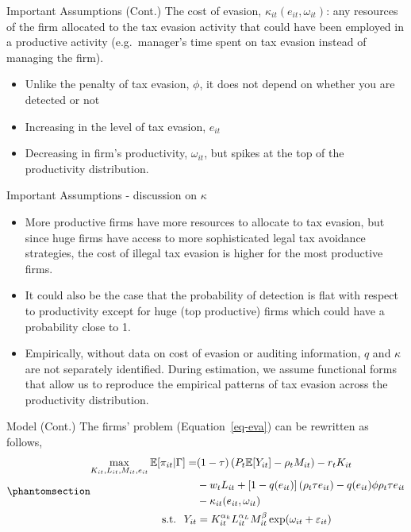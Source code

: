 \documentclass[
  ignorenonframetext,
  aspectratio=169,
]{beamer}
\providecommand{\tightlist}{%
  \setlength{\itemsep}{0pt}\setlength{\parskip}{0pt}}
\begin{document}
\begin{frame}{Important Assumptions (Cont.)}
\protect{}\label{important-assumptions-cont.}
The cost of evasion, \(\kappa_{it}(e_{it}, \omega_{it})\): any resources
of the firm allocated to the tax evasion activity that could have been
employed in a productive activity (e.g.~manager's time spent on tax
evasion instead of managing the firm).

\begin{itemize}
\tightlist
\item
  Unlike the penalty of tax evasion, \(\phi\), it does not depend on
  whether you are detected or not
\item
  Increasing in the level of tax evasion, \(e_{it}\)
\item
  Decreasing in firm's productivity, \(\omega_{it}\), but spikes at the
  top of the productivity distribution.
\end{itemize}
\end{frame}

\begin{frame}{Important Assumptions - discussion on \(\kappa\)}
\protect{}\label{important-assumptions---discussion-on-kappa}
\begin{itemize}
\tightlist
\item
  More productive firms have more resources to allocate to tax evasion,
  but since huge firms have access to more sophisticated legal tax
  avoidance strategies, the cost of illegal tax evasion is higher for
  the most productive firms.
\item
  It could also be the case that the probability of detection is flat
  with respect to productivity except for huge (top productive) firms
  which could have a probability close to 1.
\item
  Empirically, without data on cost of evasion or auditing information,
  \(q\) and \(\kappa\) are not separately identified. During estimation,
  we assume functional forms that allow us to reproduce the empirical
  patterns of tax evasion across the productivity distribution.
\end{itemize}
\end{frame}

\begin{frame}{Model (Cont.)}
\protect{}\label{model-cont.}
The firms' problem (Equation~\ref{eq-eva}) can be rewritten as follows,
\begin{equation}\protect\phantomsection\label{eq-eva-2}{
\begin{aligned}
  \max_{K_{it}, L_{it},M_{it},e_{it}} \mathbb{E}[\pi_{it}|\Gamma] = &(1-\tau)\left(P_t\mathbb{E}[Y_{it}]-\rho_{t} M_{it}\right)-r_tK_{it}\\
  &-w_tL_{it}+[1-q(e_{it})]\left(\rho_{t}\tau e_{it}\right)-q(e_{it})\phi\rho_t\tau e_{it}\\
  &-\kappa_{it}(e_{it}, \omega_{it}) \\
  \text{s.t. }\; Y_{it}&=K_{it}^{\alpha_k}L_{it}^{\alpha_L}M_{it}^{\beta}\exp(\omega_{it}+\varepsilon_{it})
\end{aligned}
}\end{equation}
\end{frame}
\end{document}
